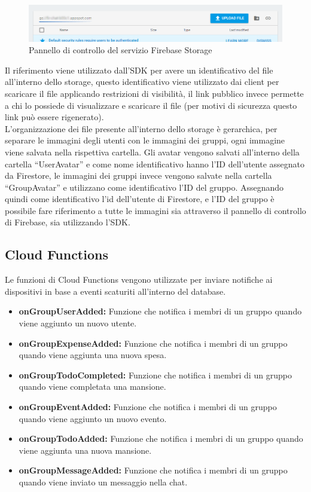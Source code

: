 \begin{figure}[!hb]
  \centering
  \includegraphics[width=1\textwidth]{immagini/firebase_storage.png}
  \caption{Pannello di controllo del servizio Firebase Storage}\label{fig:Pannello di controllo del servizio Firebase Storage}
\end{figure}

Il riferimento viene utilizzato dall'SDK per avere un identificativo del file all'interno dello storage, questo identificativo viene utilizzato dai client per scaricare il file applicando restrizioni di visibilità, il link pubblico invece permette a chi lo possiede di visualizzare e scaricare il file (per motivi di sicurezza questo link può essere rigenerato).\\
L'organizzazione dei file presente all'interno dello storage è gerarchica, per separare le immagini degli utenti con le immagini dei gruppi, ogni immagine viene salvata nella rispettiva cartella. Gli avatar vengono salvati all'interno della cartella ``UserAvatar'' e come nome identificativo hanno l'ID dell'utente assegnato da Firestore, le immagini dei gruppi invece vengono salvate nella cartella ``GroupAvatar'' e utilizzano come identificativo l'ID del gruppo.
Assegnando quindi come identificativo l'id dell'utente di Firestore, e l'ID del gruppo è possibile fare riferimento a tutte le immagini sia attraverso il pannello di controllo di Firebase, sia utilizzando l'SDK.\\




\subsection{Cloud Functions}
Le funzioni di Cloud Functions vengono utilizzate per inviare notifiche ai dispositivi in base a eventi scaturiti all'interno del database.

\begin{itemize}
    \item \textbf{onGroupUserAdded:} Funzione che notifica i membri di un gruppo quando viene aggiunto un nuovo utente.
    \item \textbf{onGroupExpenseAdded:} Funzione che notifica i membri di un gruppo quando viene aggiunta una nuova spesa.
    \item \textbf{onGroupTodoCompleted:} Funzione che notifica i membri di un gruppo quando viene completata una mansione.
    \item \textbf{onGroupEventAdded:} Funzione che notifica i membri di un gruppo quando viene aggiunto un nuovo evento.
    \item \textbf{onGroupTodoAdded:} Funzione che notifica i membri di un gruppo quando viene aggiunta una nuova mansione.
    \item \textbf{onGroupMessageAdded:} Funzione che notifica i membri di un gruppo quando viene inviato un messaggio nella chat.
\end{itemize}


